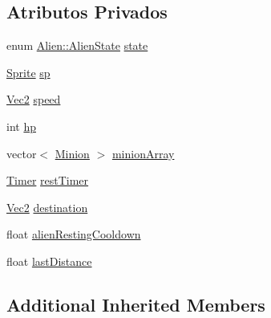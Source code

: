 \subsection*{Atributos Privados}
\begin{DoxyCompactItemize}
\item 
enum \hyperlink{classAlien_ae23fef43ed399f4b117ccf0520173455}{Alien\+::\+Alien\+State} \hyperlink{classAlien_a595501207125bf8bb67a2b07c6e580dd}{state}
\item 
\hyperlink{classSprite}{Sprite} \hyperlink{classAlien_a353c0cf8e9bb3b689b34866b3c3ac0f7}{sp}
\item 
\hyperlink{classVec2}{Vec2} \hyperlink{classAlien_a3acafe16e399a54c4d2511aad4f96cd4}{speed}
\item 
int \hyperlink{classAlien_ad88d130f8e4538ecbeede37e05f2bf32}{hp}
\item 
vector$<$ \hyperlink{classMinion}{Minion} $>$ \hyperlink{classAlien_a2ce0b76dc42b78ef26f1c524e428f682}{minion\+Array}
\item 
\hyperlink{classTimer}{Timer} \hyperlink{classAlien_a1045a69ebda8020e122db9021398098a}{rest\+Timer}
\item 
\hyperlink{classVec2}{Vec2} \hyperlink{classAlien_a9534c5cc95f08a23c91ffd8ea7fbc116}{destination}
\item 
float \hyperlink{classAlien_a61538503ff1bde408267d85464191fe4}{alien\+Resting\+Cooldown}
\item 
float \hyperlink{classAlien_a0f671a6a6f32d951a2406c87d9f18963}{last\+Distance}
\end{DoxyCompactItemize}
\subsection*{Additional Inherited Members}


